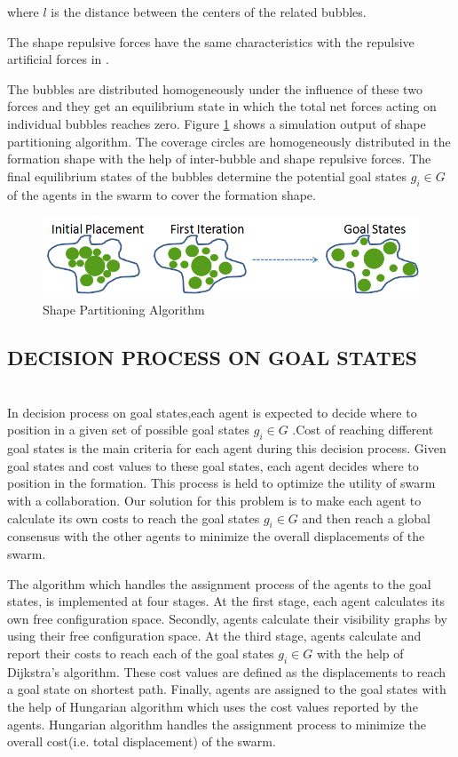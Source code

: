 \documentclass[letterpaper, 10 pt, conference]{ieeeconf}  %
\begin{document}
where $l$ is the distance between the centers of the related bubbles. 
   	
The shape repulsive forces have the same characteristics with the repulsive artificial forces in \cite{17}.
	
The bubbles are distributed homogeneously under the influence of these two forces and they get an equilibrium state in which the total net forces acting on individual bubbles reaches zero. Figure \ref{buble_ornek} shows a simulation output of shape partitioning algorithm. The coverage circles are homogeneously distributed in the formation shape with the help of inter-bubble and shape repulsive forces. The final equilibrium states of the bubbles determine the potential goal states $g_i \in G$  of the agents in the swarm to cover the formation shape.

\begin{figure}[thpb]
      \centering     
      \includegraphics[scale = 0.35]{bubble_packing2}
    \caption{Shape Partitioning Algorithm} \label{buble_ornek}
\end{figure} 
	
\subsection{DECISION PROCESS ON GOAL STATES}\hspace{0pt} \label{DecisionProcess Ref} \\
In decision process on goal states,each agent is expected to decide where to position in a given set of possible goal states $g_i \in G$ .Cost of reaching different goal states is the main criteria for each agent during this decision process. Given goal states and cost values to these goal states, each agent decides where to position in the formation. This process is held to optimize the utility of swarm with a collaboration. Our solution for this problem is to make each agent to calculate its own costs to reach the goal states $g_i \in G$ and then reach a global consensus with the other agents to minimize the overall displacements of the swarm. 

The algorithm which handles the assignment process of the agents to the goal states, is implemented at four stages. At the first stage, each agent calculates its own free configuration space. Secondly, agents calculate their visibility graphs by using their free configuration space. At the third stage,  agents calculate and report their costs to reach each of the goal states $g_i \in G$ with the help of Dijkstra's algorithm. These cost values are defined as the displacements to reach a goal state on shortest path.  Finally, agents are assigned to the goal states with the help of Hungarian algorithm which uses the cost values reported by the agents. Hungarian algorithm handles the assignment process to minimize the overall cost(i.e. total displacement) of the swarm.
	
\end{document}
